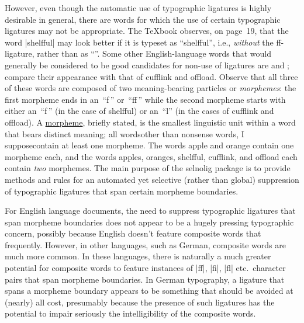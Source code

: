 \documentclass[11pt]{article}
\newcommand{\pkg}[1]{\textsf{#1}}
\begin{document}
However, even though the automatic use of typographic ligatures is highly desirable in general, there are words for which the use of certain typographic ligatures may not be appropriate. The \TeX book observes, on page~19, that the word |shelfful| may look better if it is typeset as \enquote{shelfful}, i.e., \emph{without} the ff-ligature, rather than as \enquote{}. Some other English-language words that would generally be considered to be good candidates for non-use of ligatures are  and ; compare their appearance with that of cufflink and offload. Observe that all three of these words are composed of two meaning-bearing particles or \emph{morphemes}: the first morpheme ends in an~\enquote{f\,} or~\enquote{ff\,} while the second morpheme starts with either an~\enquote{f\,} (in the case of shelfful) or an~\enquote{l} (in the cases of cufflink and offload). A \href{http://en.wikipedia.org/wiki/Morpheme}{morpheme}, briefly stated, is the smallest linguistic unit within a word that bears distinct meaning; all words\textemdash other than nonsense words, I suppose\textemdash contain at least one morpheme. The words apple and orange contain one morpheme each, and the words apples, oranges, shelfful, cufflink, and offload each contain \emph{two} morphemes. The main purpose of the \pkg{selnolig} package is to provide methods and rules for an automated yet selective (rather than global) suppression of typographic ligatures that span certain morpheme boundaries.

For English language documents, the need to suppress typographic ligatures that span morpheme boundaries does not appear to be a hugely pressing typographic concern, possibly because English doesn't feature composite words that frequently. However, in other languages, such as German, composite words are much more common. In these languages, there is naturally a much greater potential for composite words to feature instances of |ff|, |fi|, |fl| etc.\ character pairs that span morpheme boundaries. In German typography, a ligature that spans a morpheme boundary appears to be something that should be avoided at (nearly) all cost, presumably because the presence of such ligatures has the potential to impair seriously the intelligibility of the composite words.%
\end{document}
